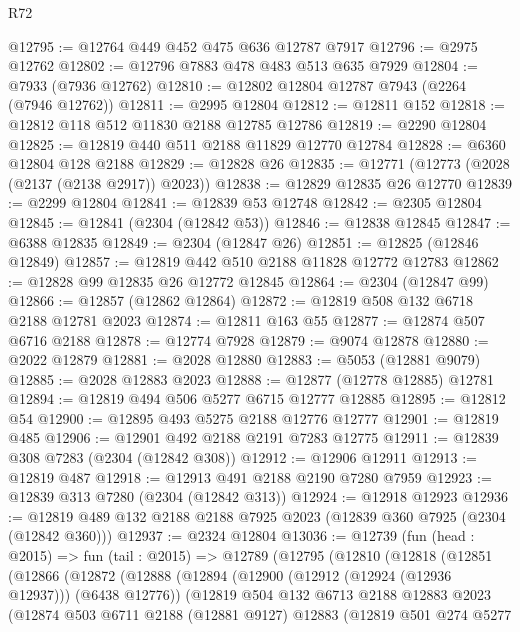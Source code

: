 \begin{lexlean}{R72}
\begin{coremodule}
@12795 := @12764 @449 @452 @475 @636 @12787 @7917
@12796 := @2975 @12762
@12802 := @12796 @7883 @478 @483 @513 @635 @7929
@12804 := @7933 (@7936 @12762)
@12810 := @12802 @12804 @12787 @7943 (@2264 (@7946 @12762))
@12811 := @2995 @12804
@12812 := @12811 @152
@12818 := @12812 @118 @512 @11830 @2188 @12785 @12786
@12819 := @2290 @12804
@12825 := @12819 @440 @511 @2188 @11829 @12770 @12784
@12828 := @6360 @12804 @128 @2188
@12829 := @12828 @26
@12835 := @12771 (@12773 (@2028 (@2137 (@2138 @2917)) @2023))
@12838 := @12829 @12835 @26 @12770
@12839 := @2299 @12804
@12841 := @12839 @53 @12748
@12842 := @2305 @12804
@12845 := @12841 (@2304 (@12842 @53))
@12846 := @12838 @12845
@12847 := @6388 @12835
@12849 := @2304 (@12847 @26)
@12851 := @12825 (@12846 @12849)
@12857 := @12819 @442 @510 @2188 @11828 @12772 @12783
@12862 := @12828 @99 @12835 @26 @12772 @12845
@12864 := @2304 (@12847 @99)
@12866 := @12857 (@12862 @12864)
@12872 := @12819 @508 @132 @6718 @2188 @12781 @2023
@12874 := @12811 @163 @55
@12877 := @12874 @507 @6716 @2188
@12878 := @12774 @7928
@12879 := @9074 @12878
@12880 := @2022 @12879
@12881 := @2028 @12880
@12883 := @5053 (@12881 @9079)
@12885 := @2028 @12883 @2023
@12888 := @12877 (@12778 @12885) @12781
@12894 := @12819 @494 @506 @5277 @6715 @12777 @12885
@12895 := @12812 @54
@12900 := @12895 @493 @5275 @2188 @12776 @12777
@12901 := @12819 @485
@12906 := @12901 @492 @2188 @2191 @7283 @12775
@12911 := @12839 @308 @7283 (@2304 (@12842 @308))
@12912 := @12906 @12911
@12913 := @12819 @487
@12918 := @12913 @491 @2188 @2190 @7280 @7959
@12923 := @12839 @313 @7280 (@2304 (@12842 @313))
@12924 := @12918 @12923
@12936 := @12819 @489 @132 @2188 @2188 @7925 @2023 (@12839 @360 @7925 (@2304 (@12842 @360)))
@12937 := @2324 @12804
@13036 := @12739
    (fun (head : @2015) =>
    fun (tail : @2015) =>
    @12789
      (@12795
        (@12810
          (@12818
            (@12851
              (@12866
                (@12872
                  (@12888
                    (@12894
                      (@12900 (@12912 (@12924 (@12936 @12937))) (@6438 @12776))
                      (@12819
                        @504
                        @132
                        @6713
                        @2188
                        @12883
                        @2023
                        (@12874
                          @503
                          @6711
                          @2188
                          (@12881 @9127)
                          @12883
                          (@12819
                            @501
                            @274
                            @5277

\end{coremodule}
\end{lexlean}
